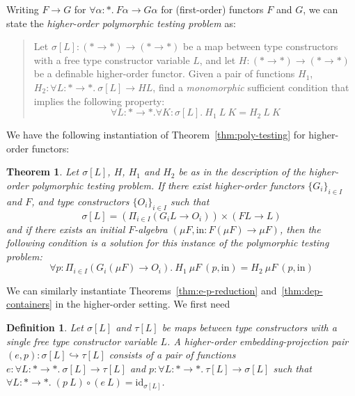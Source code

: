 \documentclass{article}[12 pt]
\newtheorem{thm}{Theorem}
\newtheorem{definition}{Definition}
\theoremstyle{problemstyle}
\begin{document}
Writing $F \rightarrow G$ for $\forall \alpha : *.\ F \alpha
\rightarrow G \alpha$ for (first-order) functors $F$ and $G$, we can
state the {\em higher-order polymorphic testing problem} as:

\begin{verse}\label{problem:hpoly-testing}
  \hspace*{0.2in}Let $\sigma[L] : (* \rightarrow *) \rightarrow (*
  \rightarrow *)$ be a map between type constructors with a free type
  constructor variable $L$, and let $H : (* \rightarrow *) \rightarrow
  (* \rightarrow *)$ be a definable higher-order functor. Given a pair
  of functions $H_1$, $H_2 : \forall L: * \rightarrow *.\ \sigma[L]
  \rightarrow HL$, find a \emph{monomorphic} sufficient condition that
  implies the following property:
  \begin{equation}
    \label{eq:hproblem}
    \forall L : * \rightarrow *. \forall K : \sigma[L].~H_1~L~K = H_2~L~K
  \end{equation}
\end{verse}

\noindent
We have the following instantiation of Theorem~\ref{thm:poly-testing}
for higher-order functors:

\begin{thm}\label{thm:hpoly-testing}
Let $\sigma[L]$, $H$, $H_1$ and $H_2$ be as in the description of the
higher-order polymorphic testing problem. If there exist higher-order
functors $\{G_i\}_{i \in I}$ and $F$, and type constructors
$\{O_i\}_{i \in I}$ such that
\begin{displaymath}
  \sigma[L] = \left( \Pi_{i \in I} (G_i L \to O_i)\right) \times (F L
  \to L)
\end{displaymath}
and if there exists an initial $F$-algebra $(\mu F, \mathrm{in} : F(\mu
F) \to \mu F)$, then the following condition is a solution for this
instance of the polymorphic testing problem:
\begin{equation}
  \label{eq:hsolution-pt}
  \forall p : \Pi_{i \in I}(G_i(\mu F) \to O_i).~H_1~\mu F~(p,
  \mathrm{in}) = H_2~\mu F~(p, \mathrm{in})
\end{equation}
\end{thm}

\vspace*{0.2in}

We can similarly instantiate Theorems~\ref{thm:e-p-reduction}
and~\ref{thm:dep-containers} in the higher-order setting. We first need

\begin{definition}
  Let $\sigma[L]$ and $\tau[L]$ be maps between type constructors with
  a single free type constructor variable $L$. A \emph{higher-order
    embedding-projection pair} $(e,p) : \sigma[L] \hookrightarrow
  \tau[L]$ consists of a pair of functions $e : \forall L: *
  \rightarrow *.~\sigma[L] \to \tau[L]$ and $p : \forall L: *
  \rightarrow *.~\tau[L] \to \sigma[L]$ such that $\forall L : *
  \rightarrow *. \; (p~L) \circ (e~L) = \mathrm{id}_{\sigma[L]}$.
\end{definition}
\end{document}
